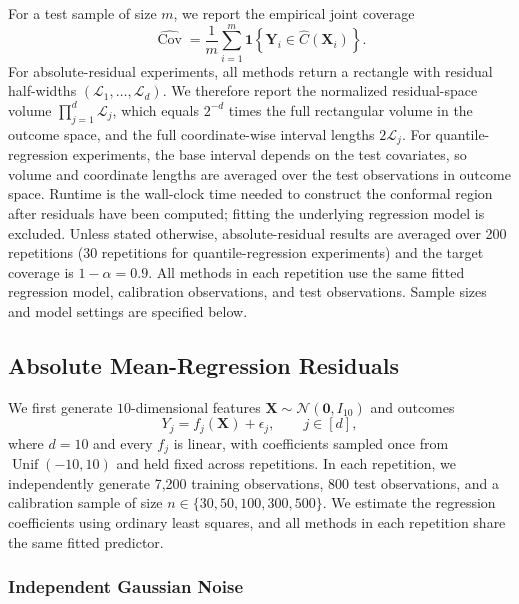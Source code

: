 For a test sample of size $m$, we report the empirical joint coverage
\[
  \widehat{\operatorname{Cov}}
  = \frac{1}{m}\sum_{i=1}^{m}
    \mathbf{1}\!\left\{\boldsymbol{Y}_i
    \in \widehat{C}(\boldsymbol{X}_i)\right\}.
\]
For absolute-residual experiments, all methods return a rectangle with residual
half-widths $(\mathcal{L}_1,\ldots,\mathcal{L}_d)$. We therefore report the normalized
residual-space volume $\prod_{j=1}^{d}\mathcal{L}_j$, which equals $2^{-d}$ times the
full rectangular volume in the outcome space, and the full coordinate-wise interval lengths
$2\mathcal{L}_j$. For quantile-regression experiments, the base interval
depends on the test covariates, so volume and coordinate lengths are
averaged over the test observations in outcome space. Runtime is
the wall-clock time needed to construct the conformal region after residuals
have been computed; fitting the underlying regression model is excluded. Unless
stated otherwise, absolute-residual results are averaged over 200 repetitions (30 repetitions for quantile-regression experiments)
and the target coverage is $1-\alpha=0.9$. All methods in each repetition use
the same fitted regression model, calibration observations, and test observations.
Sample sizes and model settings are specified below. 

\subsection{Absolute Mean-Regression Residuals}
\label{sec:absolute-residual-experiments}

We first generate $10$-dimensional features
$\boldsymbol{X}\sim\mathcal{N}(\boldsymbol{0},I_{10})$ and outcomes
\begin{equation}
  Y_j=f_j(\boldsymbol X)+\epsilon_j,\qquad j\in[d],
  \label{eq:data-generator}
\end{equation}
where $d=10$ and every $f_j$ is linear, with coefficients sampled once
from $\operatorname{Unif}(-10,10)$ and held fixed across repetitions.
In each repetition, we independently generate 7,200 training observations,
800 test observations, and a calibration sample of size $n\in\{30,50,100,300,500\}$. We
estimate the regression coefficients using
ordinary least squares, and all methods in each repetition share the same fitted predictor. 

\subsubsection{Independent Gaussian Noise}

